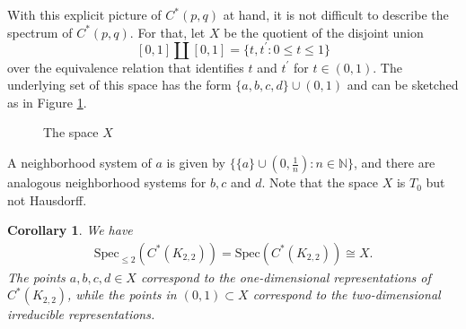 \documentclass[a4paper]{amsart}
\newtheorem{corollary}[thm]{Corollary}
\newcommand{\N}{\mathbb{N}}
\begin{document}
With this explicit picture of $C^\ast(p,q)$ at hand, it is not difficult to describe the spectrum of $C^\ast(p,q)$. For that, let $X$ be the quotient of the disjoint union 
$$
    [0,1] \amalg [0,1] = \{t, t^\prime: 0 \leq t \leq 1\}
$$ 
over the equivalence relation that identifies $t$ and $t^\prime$ for $t \in (0,1)$. The underlying set of this space has the form $\{a, b, c, d\} \cup (0,1)$ and can be sketched as in Figure \ref{reps::fig:X}.
%
\begin{figure}[hbt]
    \caption{The space $X$}
    \label{reps::fig:X}
\end{figure}
%
A neighborhood system of $a$ is given by $\{ \{a\} \cup (0, \frac{1}{n}): n \in \N\}$, and there are analogous neighborhood systems for $b, c$ and $d$. 
Note that the space $X$ is $T_0$ but not Hausdorff. %

\begin{corollary} 
    \label{reps::cor:X_is_Spec(K22)}
    We have
    \begin{align*}
        \mathrm{Spec}_{\leq 2}(C^\ast(K_{2,2})) = \mathrm{Spec}(C^\ast(K_{2,2})) \cong X.
    \end{align*}
    The points $a, b, c, d \in X$ correspond to the one-dimensional representations of $C^\ast(K_{2,2})$, while the points in $(0,1) \subset X$ correspond to the two-dimensional irreducible representations.
\end{corollary}
\end{document}
